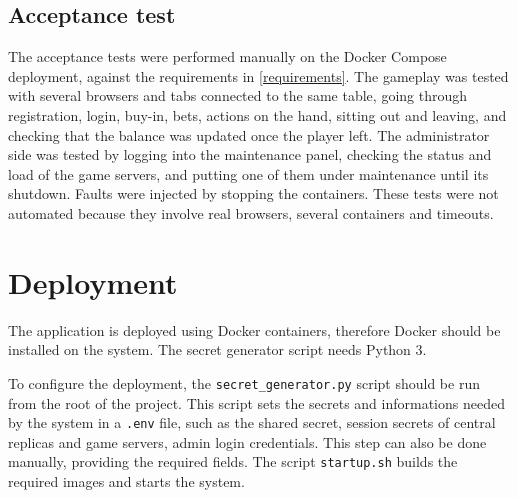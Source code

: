 \documentclass{scrartcl}
\begin{document}


\subsection{Acceptance test}\label{acceptance-test}

The acceptance tests were performed manually on the Docker Compose deployment, against the requirements in \cref{requirements}.
The gameplay was tested with several browsers and tabs connected to the same table, going through registration, login, buy-in, bets, actions on the hand, sitting out and leaving, and checking that the balance was updated once the player left.
The administrator side was tested by logging into the maintenance panel, checking the status and load of the game servers, and putting one of them under maintenance until its shutdown.
Faults were injected by stopping the containers.
These tests were not automated because they involve real browsers, several containers and timeouts.



\section{Deployment}\label{deployment}

The application is deployed using Docker containers, therefore Docker should be installed on the system.
The secret generator script needs Python 3.

To configure the deployment, the \texttt{secret\_generator.py} script should be run from the root of the project.
This script sets the secrets and informations needed by the system in a \texttt{.env} file, such as the shared secret, session secrets of central replicas and game servers, admin login credentials.
This step can also be done manually, providing the required fields.
The script \texttt{startup.sh} builds the required images and starts the system.
\end{document}
